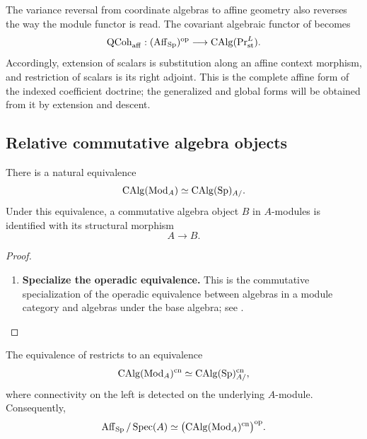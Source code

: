 \begin{remark}
\label{rem:affine-indexed-spectral-doctrine}
The variance reversal from coordinate algebras to affine geometry also
reverses the way the module functor is read. The covariant algebraic functor
of  becomes
\[
    \operatorname{QCoh}_{\mathrm{aff}}
    :
    (\operatorname{Aff}_{\operatorname{Sp}})^{\mathrm{op}}
    \longrightarrow
    \operatorname{CAlg}(\operatorname{Pr}^L_{\mathrm{st}}).
\]
Accordingly, extension of scalars is substitution along an affine context
morphism, and restriction of scalars is its right adjoint. This is the
complete affine form of the indexed coefficient doctrine; the generalized
and global forms will be obtained from it by extension and descent.
\end{remark}

\subsection{Relative commutative algebra objects}

\begin{proposition}
\label{prop:relative-commutative-spectral-algebras}
There is a natural equivalence
\[
    \operatorname{CAlg}(\operatorname{Mod}_A)
    \simeq
    \operatorname{CAlg}(\operatorname{Sp})_{A/}.
\]
Under this equivalence, a commutative algebra object $B$ in $A$-modules is
identified with its structural morphism
\[
    A
    \longrightarrow
    B.
\]
\end{proposition}

\begin{proof}
\leavevmode
\begin{enumerate}[label=\textup{(\arabic*)}]
    \item \textbf{Specialize the operadic equivalence.}
    This is the commutative specialization of the operadic equivalence between
    algebras in a module category and algebras under the base algebra; see
    \cite[Corollary~3.4.1.7]{LurieHigherAlgebra}.
\end{enumerate}
\end{proof}

\begin{proposition}
\label{prop:connective-relative-algebras}
The equivalence of 
restricts to an equivalence
\[
    \operatorname{CAlg}(\operatorname{Mod}_A)^{\mathrm{cn}}
    \simeq
    \operatorname{CAlg}(\operatorname{Sp})^{\mathrm{cn}}_{A/},
\]
where connectivity on the left is detected on the underlying $A$-module.
Consequently,
\[
    \operatorname{Aff}_{\operatorname{Sp}}/\operatorname{Spec}(A)
    \simeq
    \bigl(
        \operatorname{CAlg}(\operatorname{Mod}_A)^{\mathrm{cn}}
    \bigr)^{\mathrm{op}}.
\]
\end{proposition}

